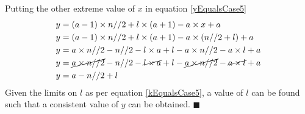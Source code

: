 \documentclass[12pt, twoside]{article}
\begin{document}
Putting the other extreme value of $x$ in equation \eqref{yEqualsCase5}
\begin{align*}
	y &= (a-1)\times n//2 + l\times(a+1) - a\times x + a \\
	y &= (a-1)\times n//2 + l\times(a+1) - a\times (n//2+l) + a \\	
	y &= a\times n//2 - n//2 - l\times a + l -a\times n//2 - a \times l + a \\
	y &= \cancel{a\times n//2} - n//2 - \cancel{l\times a} + l -\cancel{a\times n//2} - \cancel{a \times l} + a \\
	y &= a - n//2 + l \\
\end{align*}
Given the limits on $l$ as per equation \eqref{kEqualsCase5}, a value of $l$ can be found such that a consistent value of $y$ can be obtained. $\blacksquare$\\
\end{document}
